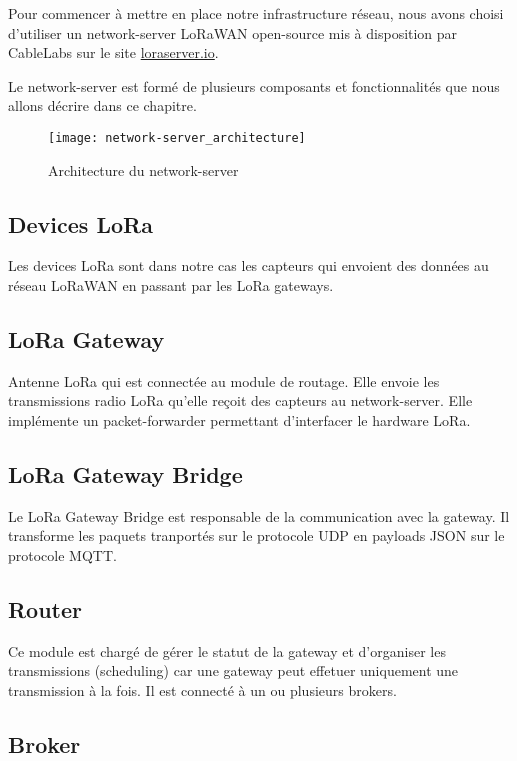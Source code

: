 Pour commencer à mettre en place notre infrastructure réseau, nous avons choisi d'utiliser un network-server LoRaWAN open-source mis à disposition par CableLabs sur le site \url{loraserver.io}.

Le network-server est formé de plusieurs composants et fonctionnalités que nous allons décrire dans ce chapitre.

\vspace{2mm}
\begin{figure}[h!]
\centering
\texttt{[image: network-server\_architecture]}
\caption{Architecture du network-server}
\end{figure}

\subsection{Devices LoRa}

Les devices LoRa sont dans notre cas les capteurs qui envoient des données au réseau LoRaWAN en passant par les LoRa gateways.

\subsection{LoRa Gateway}

Antenne LoRa qui est connectée au module de routage. Elle envoie les transmissions radio LoRa qu'elle reçoit des capteurs au network-server. Elle implémente un packet-forwarder permettant d'interfacer le hardware LoRa.

\subsection{LoRa Gateway Bridge}

Le LoRa Gateway Bridge est responsable de la communication avec la gateway. Il transforme les paquets tranportés sur le protocole UDP en payloads JSON sur le protocole MQTT.

\subsection{Router}

Ce module est chargé de gérer le statut de la gateway et d'organiser les transmissions (scheduling) car une gateway peut effetuer uniquement une transmission à la fois. Il est connecté à un ou plusieurs brokers.

\subsection{Broker}

